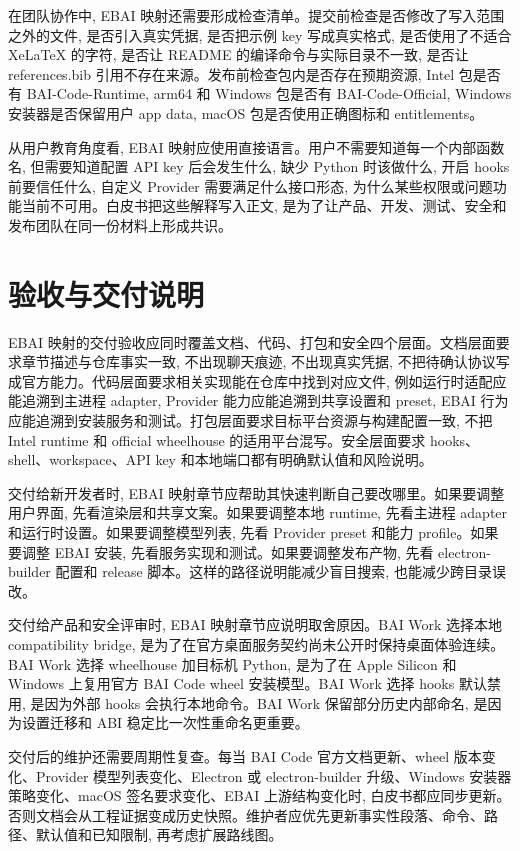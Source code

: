 在团队协作中, EBAI 映射还需要形成检查清单。提交前检查是否修改了写入范围之外的文件, 是否引入真实凭据, 是否把示例 key 写成真实格式, 是否使用了不适合 XeLaTeX 的字符, 是否让 README 的编译命令与实际目录不一致, 是否让 references.bib 引用不存在来源。发布前检查包内是否存在预期资源, Intel 包是否有 BAI-Code-Runtime, arm64 和 Windows 包是否有 BAI-Code-Official, Windows 安装器是否保留用户 app data, macOS 包是否使用正确图标和 entitlements。

从用户教育角度看, EBAI 映射应使用直接语言。用户不需要知道每一个内部函数名, 但需要知道配置 API key 后会发生什么, 缺少 Python 时该做什么, 开启 hooks 前要信任什么, 自定义 Provider 需要满足什么接口形态, 为什么某些权限或问题功能当前不可用。白皮书把这些解释写入正文, 是为了让产品、开发、测试、安全和发布团队在同一份材料上形成共识。

\section{验收与交付说明}
EBAI 映射的交付验收应同时覆盖文档、代码、打包和安全四个层面。文档层面要求章节描述与仓库事实一致, 不出现聊天痕迹, 不出现真实凭据, 不把待确认协议写成官方能力。代码层面要求相关实现能在仓库中找到对应文件, 例如运行时适配应能追溯到主进程 adapter, Provider 能力应能追溯到共享设置和 preset, EBAI 行为应能追溯到安装服务和测试。打包层面要求目标平台资源与构建配置一致, 不把 Intel runtime 和 official wheelhouse 的适用平台混写。安全层面要求 hooks、shell、workspace、API key 和本地端口都有明确默认值和风险说明。

交付给新开发者时, EBAI 映射章节应帮助其快速判断自己要改哪里。如果要调整用户界面, 先看渲染层和共享文案。如果要调整本地 runtime, 先看主进程 adapter 和运行时设置。如果要调整模型列表, 先看 Provider preset 和能力 profile。如果要调整 EBAI 安装, 先看服务实现和测试。如果要调整发布产物, 先看 electron-builder 配置和 release 脚本。这样的路径说明能减少盲目搜索, 也能减少跨目录误改。

交付给产品和安全评审时, EBAI 映射章节应说明取舍原因。BAI Work 选择本地 compatibility bridge, 是为了在官方桌面服务契约尚未公开时保持桌面体验连续。BAI Work 选择 wheelhouse 加目标机 Python, 是为了在 Apple Silicon 和 Windows 上复用官方 BAI Code wheel 安装模型。BAI Work 选择 hooks 默认禁用, 是因为外部 hooks 会执行本地命令。BAI Work 保留部分历史内部命名, 是因为设置迁移和 ABI 稳定比一次性重命名更重要。

交付后的维护还需要周期性复查。每当 BAI Code 官方文档更新、wheel 版本变化、Provider 模型列表变化、Electron 或 electron-builder 升级、Windows 安装器策略变化、macOS 签名要求变化、EBAI 上游结构变化时, 白皮书都应同步更新。否则文档会从工程证据变成历史快照。维护者应优先更新事实性段落、命令、路径、默认值和已知限制, 再考虑扩展路线图。

